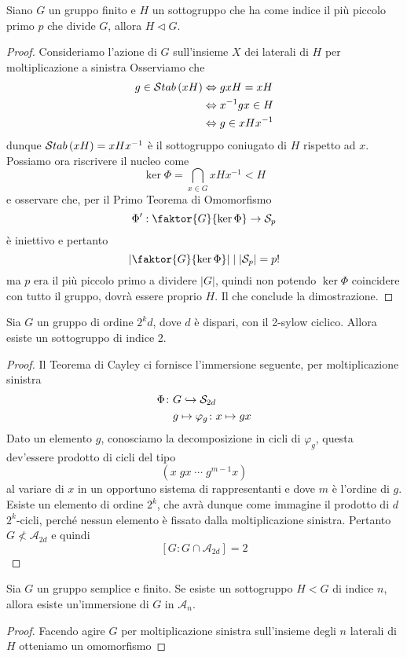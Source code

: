 \begin{multicols}{2}
	
	\begin{prop}\label{ppp}
		Siano $ G $ un gruppo finito e $ H $ un sottogruppo che ha come indice il più piccolo primo $ p $ che divide $ G $, allora $ H \lhd G $.
	\end{prop}
	\begin{proof}
		Consideriamo l'azione di $ G $ sull'insieme $ X $ dei laterali di $ H $ per moltiplicazione a sinistra 
		Osserviamo che 
		\begin{align*}
		g \in \Stab{xH} &\Leftrightarrow gxH = xH \\
		&\Leftrightarrow x^{-1}gx \in H \\
		&\Leftrightarrow g \in xHx^{-1} \\
		\end{align*}
		dunque $ \Stab{xH} = xHx^{-1} $ è il sottogruppo coniugato di $ H $ rispetto ad $ x $. Possiamo ora riscrivere il nucleo come
		\[ \ker\Phi = \bigcap_{x \in G} xHx^{-1} < H \]
		e osservare che, per il Primo Teorema di Omomorfismo
		\[ \Phi ' : \faktor{G}{\ker\Phi} \rightarrow \mathcal{S}_p \]
		è iniettivo e pertanto
		\[ \left| \faktor{G}{\ker\Phi} \right| \mid |\mathcal{S}_p| = p! \]
		ma $ p $ era il più piccolo primo a dividere $ |G| $, quindi non potendo $ \ker\Phi $ coincidere con tutto il gruppo, dovrà essere proprio $ H $. Il che conclude la dimostrazione.
	\end{proof}
	
	\begin{prop}
		Sia $ G $ un gruppo di ordine $ 2^kd $, dove $ d $ è dispari, con il 2-sylow ciclico. Allora esiste un sottogruppo di indice 2.
	\end{prop}
	\begin{proof}
		Il Teorema di Cayley ci fornisce l'immersione seguente, per moltiplicazione sinistra
		\begin{align*}
		\Phi \colon & G \hookrightarrow \S_{2d} \\
		& g \mapsto \varphi_g \colon x \mapsto gx
		\end{align*}
		Dato un elemento $ g $, conosciamo la decomposizione in cicli di $ \varphi_g $, questa dev'essere prodotto di cicli del tipo
		$$  (x \; gx \; \cdots \; g^{m-1}x)  $$
		al variare di $ x $ in un opportuno sistema di rappresentanti e dove $ m $ è l'ordine di $ g $. Esiste un elemento di ordine $ 2^k $, che avrà dunque come immagine il prodotto di $ d $ $2^k $-cicli, perché nessun elemento è fissato dalla moltiplicazione sinistra. Pertanto $ G \nless \mathcal{A}_{2d} $ e quindi $$  [G : G \cap \mathcal{A}_{2d}] = 2  $$
	\end{proof}
	\columnbreak
	\begin{prop}
		Sia $ G $ un gruppo semplice e finito. Se esiste un sottogruppo $ H < G $ di indice $ n $, allora esiste un'immersione di $ G $ in $ \mathcal{A}_n $.
	\end{prop}
	\begin{proof}
		Facendo agire $ G $ per moltiplicazione sinistra sull'insieme degli $ n $ laterali di $ H $ otteniamo un omomorfismo
		

\end{proof}
\end{multicols}
